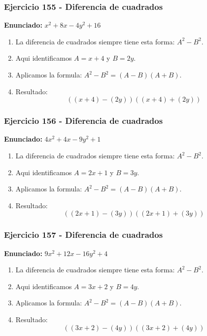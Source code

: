 \documentclass[11pt,a4paper]{article}
\begin{document}
\vspace{0.2cm}
\subsubsection*{Ejercicio 155 - Diferencia de cuadrados}
\textbf{Enunciado:} $ x^{2} + 8 x - 4 y^{2} + 16 $\par
\begin{enumerate}[leftmargin=2em]
\item La diferencia de cuadrados siempre tiene esta forma: \(A^2-B^2\).
\item Aqui identificamos \(A=x + 4\) y \(B=2 y\).
\item Aplicamos la formula: \(A^2-B^2=(A-B)(A+B)\).
\item Resultado: \[\boxed{\left(\left(x + 4\right)-\left(2 y\right)\right)\left(\left(x + 4\right)+\left(2 y\right)\right)}\]
\end{enumerate}

\vspace{0.2cm}
\subsubsection*{Ejercicio 156 - Diferencia de cuadrados}
\textbf{Enunciado:} $ 4 x^{2} + 4 x - 9 y^{2} + 1 $\par
\begin{enumerate}[leftmargin=2em]
\item La diferencia de cuadrados siempre tiene esta forma: \(A^2-B^2\).
\item Aqui identificamos \(A=2 x + 1\) y \(B=3 y\).
\item Aplicamos la formula: \(A^2-B^2=(A-B)(A+B)\).
\item Resultado: \[\boxed{\left(\left(2 x + 1\right)-\left(3 y\right)\right)\left(\left(2 x + 1\right)+\left(3 y\right)\right)}\]
\end{enumerate}

\vspace{0.2cm}
\subsubsection*{Ejercicio 157 - Diferencia de cuadrados}
\textbf{Enunciado:} $ 9 x^{2} + 12 x - 16 y^{2} + 4 $\par
\begin{enumerate}[leftmargin=2em]
\item La diferencia de cuadrados siempre tiene esta forma: \(A^2-B^2\).
\item Aqui identificamos \(A=3 x + 2\) y \(B=4 y\).
\item Aplicamos la formula: \(A^2-B^2=(A-B)(A+B)\).
\item Resultado: \[\boxed{\left(\left(3 x + 2\right)-\left(4 y\right)\right)\left(\left(3 x + 2\right)+\left(4 y\right)\right)}\]
\end{enumerate}
\end{document}
